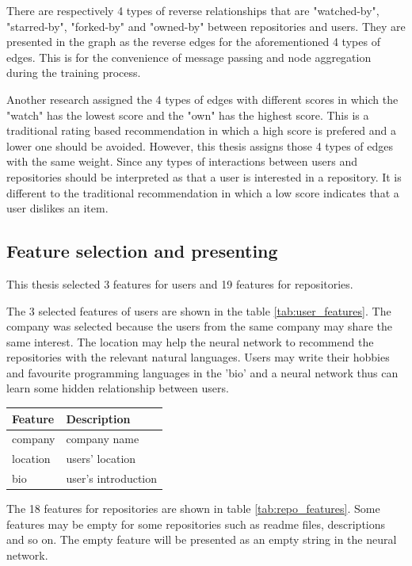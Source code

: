 \documentclass[11pt,twoside]{report}
\begin{document}
There are respectively 4 types of reverse relationships that are "watched-by", "starred-by", "forked-by" and "owned-by" between repositories and users. They are presented in the graph as the reverse edges for the aforementioned 4 types of edges. This is for the convenience of message passing and node aggregation during the training process.

Another research \cite{sun_personalized_2018} assigned the 4 types of edges with different scores in which the "watch" has the lowest score and the "own" has the highest score. This is a traditional rating based recommendation in which a high score is prefered and a lower one should be avoided. However, this thesis assigns those 4 types of edges with the same weight. Since any types of interactions between users and repositories should be interpreted as that a user is interested in a repository. It is different to the traditional recommendation in which a low score indicates that a user dislikes an item.

\subsection{Feature selection and presenting}
This thesis selected 3 features for users and 19 features for repositories. 

The 3 selected features of users are shown in the table \ref{tab:user_features}. The company was selected because the users from the same company may share the same interest. The location may help the neural network to recommend the repositories with the relevant natural languages. Users may write their hobbies and favourite programming languages in the 'bio' and a neural network thus can learn some hidden relationship between users.

\begin{center}
    \begin{tabular}{| l | l |}
    \hline
    Feature & Description \\ \hline
    company & company name \\ \hline
    location & users' location \\ \hline
    bio & user's introduction \\ \hline
    \end{tabular}
    \label{tab:user_features}
\end{center}

The 18 features for repositories are shown in table \ref{tab:repo_features}. Some features may be empty for some repositories such as readme files, descriptions and so on. The empty feature will be presented as an empty string in the neural network.
\end{document}
